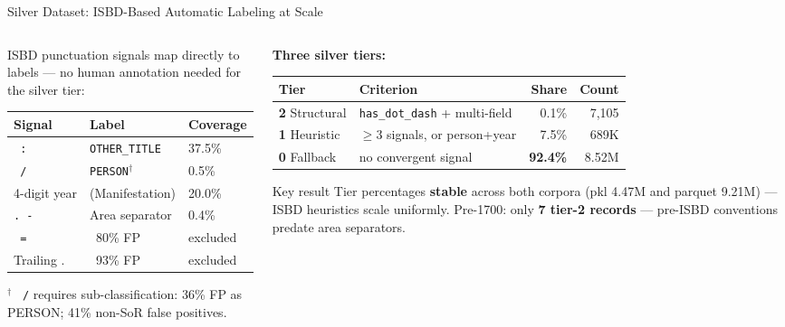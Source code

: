 \documentclass[xcolor,aspectratio=169,compress]{beamer}
\newcommand{\xmark}{\textcolor{red}{\ding{55}}}
\begin{document}

\begin{frame}{Silver Dataset: ISBD-Based Automatic Labeling at Scale}
  \small
  \begin{columns}
    \begin{column}{.48\textwidth}
      ISBD punctuation signals map directly to labels ---
      no human annotation needed for the silver tier:
      \smallskip
      \begin{center}
      \begin{tabular}{lll}
        \toprule
        Signal & Label & Coverage \\
        \midrule
        \texttt{ :}   & \texttt{OTHER\_TITLE} & 37.5\% \\
        \texttt{ /}   & \texttt{PERSON}$^\dagger$ & 0.5\% \\
        4-digit year  & (Manifestation) & 20.0\% \\
        \texttt{. -}  & Area separator  & 0.4\% \\
        \texttt{ =}   & \xmark~80\% FP  & excluded \\
        Trailing .    & \xmark~93\% FP  & excluded \\
        \bottomrule
      \end{tabular}
      \end{center}
      \footnotesize
      $^\dagger$ \texttt{ /} requires sub-classification:
      36\% FP as PERSON; 41\% non-SoR false positives.
    \end{column}
    \begin{column}{.48\textwidth}
      \textbf{Three silver tiers:}
      \smallskip
      \begin{tabular}{llrr}
        \toprule
        Tier & Criterion & Share & Count \\
        \midrule
        \textbf{2} Structural  & \texttt{has\_dot\_dash} + multi-field & 0.1\% & 7,105 \\
        \textbf{1} Heuristic   & $\geq$3 signals, or person+year & 7.5\% & 689K \\
        \textbf{0} Fallback    & no convergent signal & \textbf{92.4\%} & 8.52M \\
        \bottomrule
      \end{tabular}
      \medskip

      \begin{block}{Key result}
        \footnotesize
        Tier percentages \textbf{stable} across both corpora (pkl 4.47M
        and parquet 9.21M) --- ISBD heuristics scale uniformly.
        Pre-1700: only \textbf{7 tier-2 records} ---
        pre-ISBD conventions predate area separators.
      \end{block}
    \end{column}
  \end{columns}
\end{frame}
\end{document}

